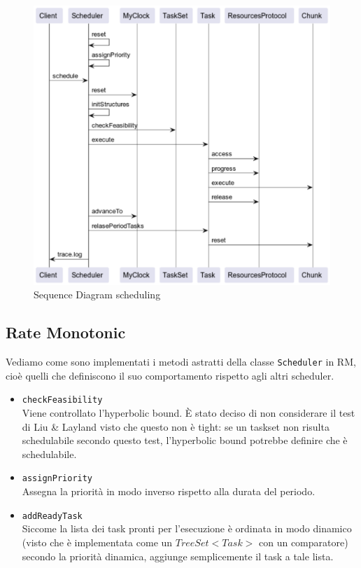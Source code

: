 \begin{figure}[htbp]
    \centering
    \includegraphics[width=.65\textwidth]{immagini/sequence diagram.pdf}
    \caption{Sequence Diagram scheduling}
    \label{fig:sequenceDiagram}
\end{figure}

\subsection{Rate Monotonic}
Vediamo come sono implementati i metodi astratti della classe \texttt{Scheduler} in RM, cioè quelli che definiscono il suo comportamento rispetto agli altri scheduler.
\begin{itemize}
    \item \texttt{checkFeasibility} \\
        Viene controllato l'hyperbolic bound. È stato deciso di non considerare il test di Liu \& Layland visto che questo non è tight: se un taskset non risulta schedulabile secondo questo test, l'hyperbolic bound potrebbe definire che è schedulabile.
    \item \texttt{assignPriority} \\
        Assegna la priorità in modo inverso rispetto alla durata del periodo.
    \item \texttt{addReadyTask} \\
        Siccome la lista dei task pronti per l'esecuzione è ordinata in modo dinamico (visto che è implementata come un $TreeSet<Task>$ con un comparatore) secondo la priorità dinamica, aggiunge semplicemente il task a tale lista.
\end{itemize}

